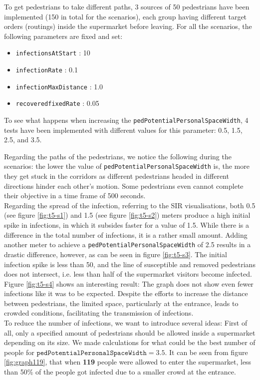 To get pedestrians to take different paths, 3 sources of 50 pedestrians have been implemented (150 in total for the scenarios), each group having different target orders (routings) inside the supermarket before leaving. 
For all the scenarios, the following parameters are fixed and set:
\begin{itemize}
    \item \texttt{infectionsAtStart} : 10 
    \item \texttt{infectionRate} : 0.1
    \item \texttt{infectionMaxDistance} : 1.0
    \item \texttt{recoveredfixedRate} : 0.05
\end{itemize}

To see what happens when increasing the \texttt{pedPotentialPersonalSpaceWidth}, 4 tests have been implemented with different values for this parameter: 0.5, 1.5, 2.5, and 3.5. 

Regarding the paths of the pedestrians, we notice the following during the scenarios: the lower the value of \texttt{pedPotentialPersonalSpaceWidth} is, the more they get stuck in the corridors as different pedestrians headed in different directions hinder each other's motion. Some pedestrians even cannot complete their objective in a time frame of 500 seconds.\\

Regarding the spread of the infection, referring to the SIR visualisations, 
both 0.5 (see figure \ref{fig:t5-s1}) and 1.5 (see figure \ref{fig:t5-s2}) meters produce a high initial spike in infections, in which it subsides faster for a value of 1.5. While there is a difference in the total number of infections, it is a rather small amount. Adding another meter to achieve a \texttt{pedPotentialPersonalSpaceWidth} of 2.5 results in a drastic difference, however, as can be seen in figure \ref{fig:t5-s3}. The initial infection spike is less than 50, and the line of susceptible and removed pedestrians does not intersect, i.e. less than half of the supermarket visitors become infected. Figure \ref{fig:t5-s4} shows an interesting result: The graph does not show even fewer infections like it was to be expected. Despite the efforts to increase the distance between pedestrians, the limited space, particularly at the entrance, leads to crowded conditions, facilitating the transmission of infections. \\

To reduce the number of infections, we want to introduce several ideas: First of all, only a specified amount of pedestrians should be allowed inside a supermarket depending on its size. We made calculations for what could be the best number of people for $\texttt{pedPotentialPersonalSpaceWidth} = 3.5$. It can be seen from figure \ref{fig:graph119}, that when \textbf{119} people were allowed to enter the supermarket, less than 50\% of the people got infected due to a smaller crowd at the entrance.

